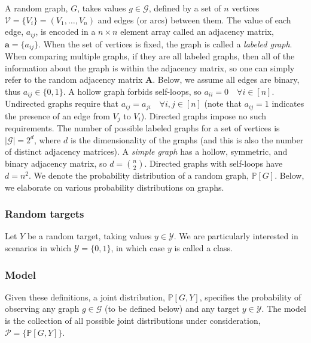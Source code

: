 \documentclass[10pt,journal,cspaper,compsoc]{IEEEtran}
\providecommand{\mc}[1]{\mathcal{#1}}
\providecommand{\mb}[1]{\mathbf{#1}}
\newcommand{\PP}{\mathbb{P}}
\begin{document}
A random graph, $G$, takes values $g \in \mc{G}$, defined by a set of $n$ vertices $\mc{V}=\{V_i\}=(V_1,\ldots,V_n)$ and edges (or arcs) between them. The value of each edge, $a_{ij}$, is encoded in a $n \times n$ element array called an adjacency matrix, $\mb{a}=\{a_{ij}\}$.  When the set of vertices is fixed, the graph is called a \emph{labeled graph}.  When comparing multiple graphs, if they are all labeled graphs, then all of the information about the graph is within the adjacency matrix, so one can simply refer to the random adjacency matrix $\mb{A}$.   Below, we assume all edges are binary, thus $a_{ij} \in \{0,1\}$. A hollow graph forbids self-loops, so $a_{ii}=0\quad \forall i \in [n]$. Undirected graphs require that $a_{ij}=a_{ji}\quad \forall i,j \in [n]$ (note that $a_{ij}=1$ indicates the presence of an edge from $V_j$ to $V_i$). Directed graphs impose no such requirements.  The number of possible labeled graphs for a set of vertices is $|\mc{G}|=2^d$, where $d$ is the dimensionality of the graphs (and this is also the number of distinct adjacency matrices).  A \emph{simple graph} has a hollow, symmetric, and binary adjacency matrix, so $d={n \choose 2}$.  Directed graphs with self-loops have $d=n^2$.  We denote the probability distribution of a random graph, $\PP[G]$.  Below, we elaborate on various probability distributions on graphs.   



\subsubsection{Random targets} %
\label{ssub:random_targets}

Let $Y$ be a random target, taking values $y \in \mc{Y}$.  We are particularly interested in scenarios in which $\mc{Y}=\{0,1\}$, in which case $y$ is called a class.




\subsubsection{Model} %
\label{ssub:model}


Given these definitions, a joint distribution, $\PP[G,Y]$, specifies the probability of observing any graph $g \in \mc{G}$ (to be defined below) and any target $y \in \mc{Y}$.  The model is the collection of all possible joint distributions under consideration, $\mc{P}=\{\PP[G,Y]\}$.
\end{document}
